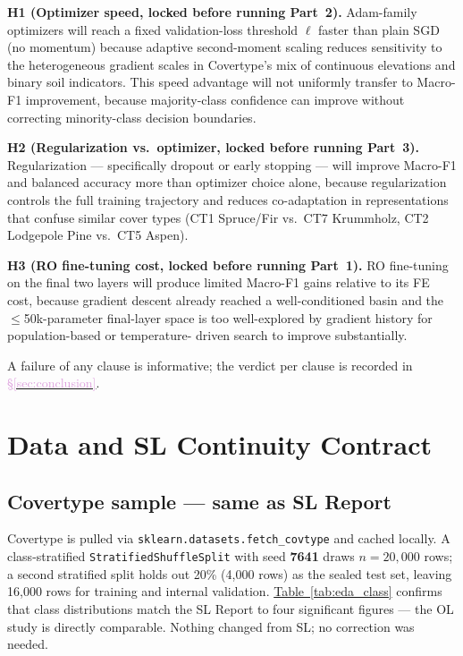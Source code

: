 \documentclass[conference]{IEEEtran}
\newcommand{\tabref}[1]{\hyperref[#1]{\textcolor{sage}{Table~\ref*{#1}}}}
\newcommand{\secref}[1]{\hyperref[#1]{\textcolor{plum}{\S\ref*{#1}}}}
\begin{document}
\textbf{H1 (Optimizer speed, locked before running Part~2).}
Adam-family optimizers will reach a fixed validation-loss threshold $\ell$
faster than plain SGD (no momentum) because adaptive second-moment scaling
\cite{kingma2014adam} reduces sensitivity to the heterogeneous gradient scales
in Covertype's mix of continuous elevations and binary soil indicators.
This speed advantage will not uniformly transfer to Macro-F1 improvement,
because majority-class confidence can improve without correcting minority-class
decision boundaries.

\textbf{H2 (Regularization vs.\ optimizer, locked before running Part~3).}
Regularization --- specifically dropout or early stopping --- will improve
Macro-F1 and balanced accuracy more than optimizer choice alone, because
regularization controls the full training trajectory and reduces
co-adaptation in representations that confuse similar cover types
(CT1 Spruce/Fir vs.\ CT7 Krummholz, CT2 Lodgepole Pine vs.\ CT5 Aspen).

\textbf{H3 (RO fine-tuning cost, locked before running Part~1).}
RO fine-tuning on the final two layers will produce limited Macro-F1 gains
relative to its FE cost, because gradient descent already reached a
well-conditioned basin and the $\leq$50k-parameter final-layer space is
too well-explored by gradient history for population-based or temperature-
driven search to improve substantially.

A failure of any clause is informative; the verdict per clause is
recorded in \secref{sec:conclusion}.

\section{Data and SL Continuity Contract}\label{sec:data}

\subsection{Covertype sample --- same as SL Report}\label{sec:data:sample}
Covertype is pulled via \texttt{sklearn.datasets.fetch\_covtype} and cached
locally.
A class-stratified \texttt{StratifiedShuffleSplit} with seed \textbf{7641}
draws $n{=}20{,}000$ rows; a second stratified split holds out 20\%
(4{,}000 rows) as the sealed test set, leaving 16{,}000 rows for training
and internal validation.
\tabref{tab:eda_class} confirms that class distributions match the SL Report
to four significant figures --- the OL study is directly comparable.
Nothing changed from SL; no correction was needed.
\end{document}
